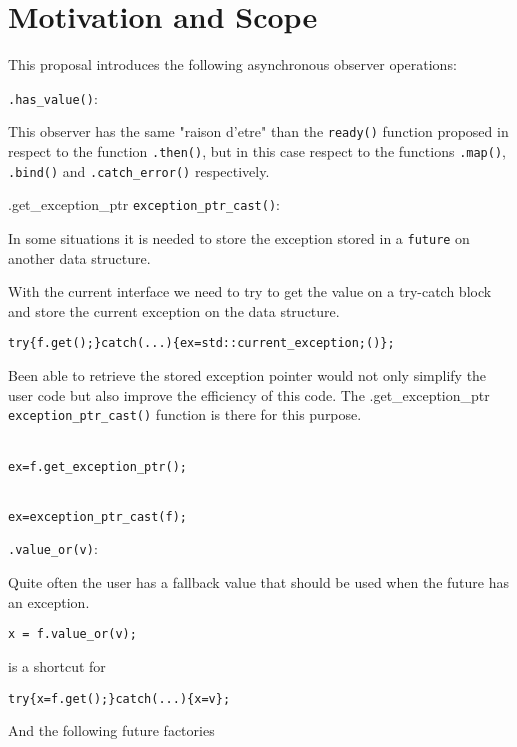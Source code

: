 \documentclass[a4paper,10pt]{article}
\newcommand{\cpp}[1]{\lstinline{#1}}
\newcommand{\suppress}[1]{\colorbox{suppress_color}{#1}}
\newcommand{\update}[1]{\colorbox{update_color}{#1}}
\begin{document}
\section{Motivation and Scope}

This proposal introduces the following asynchronous observer operations:

\cpp{.has_value()}:

This observer has the same "raison d'etre" than the \cpp{ready()} function proposed in  \cite{N3784} respect to the function \cpp{.then()}, but in this case respect to the functions \cpp{.map()}, \cpp{.bind()} and \cpp{.catch_error()} respectively.

\suppress{.get_exception_ptr}\update{ \cpp{exception_ptr_cast()}:}

In some situations it is needed to store the exception stored in a \cpp{future} on another data structure. 

With the current interface we need to try to get the value on a try-catch block and store the current exception on the data structure. 

\begin{alltt}
try \{ f.get(); \} catch(...) \{ ex = std::current_exception;() \};
\end{alltt}

Been able to retrieve the stored exception \suppress{pointer} would not only simplify the user code but also improve the efficiency of this code. The \suppress{.get_exception_ptr}\update{ \cpp{exception_ptr_cast()}} function is there for this purpose.

\begin{alltt}
\suppress{
ex = f.get_exception_ptr();
}
\end{alltt}
\begin{alltt}
\update{
ex = exception_ptr_cast(f);
}
\end{alltt}
 

\cpp{.value_or(v)}:

Quite often the user has a fallback value that should be used when the future has an exception.

\begin{lstlisting}[xleftmargin=0pt]
x = f.value_or(v);
\end{lstlisting}

is a shortcut for 
\begin{alltt}
try \{ x = f.get(); \} catch(...) \{ x = v \};
\end{alltt}

And the following future factories
\end{document}
